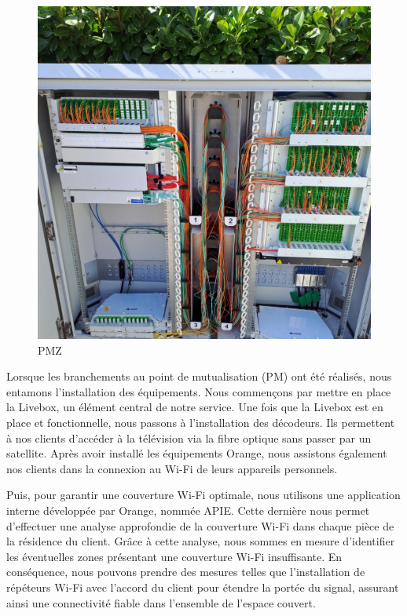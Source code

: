\documentclass[12pt, a4paper]{article}
\begin{document}
\begin{figure}[htbp]
\begin{minipage}[b]{0.4\textwidth}
      \includegraphics[width=\textwidth]{img/pmz.jpg}
      \caption{PMZ}
    \end{minipage}
\end{figure}

Lorsque les branchements au point de mutualisation (PM) ont été réalisés,
nous entamons l'installation des équipements. Nous commençons par mettre en place la Livebox,
un élément central de notre service.
Une fois que la Livebox est en place et fonctionnelle,
nous passons à l'installation des décodeurs. Ils
permettent à nos clients d'accéder à la télévision via la fibre optique
sans passer par un satellite. 
Après avoir installé les équipements Orange, nous assistons également
nos clients dans la connexion au Wi-Fi de leurs appareils personnels.

\newpage
Puis, pour garantir une couverture Wi-Fi optimale, nous utilisons une
application interne développée par Orange,
nommée APIE. Cette dernière nous permet d'effectuer
une analyse approfondie de la couverture Wi-Fi dans chaque pièce
de la résidence du client. Grâce à cette analyse,
nous sommes en mesure d'identifier les éventuelles zones
présentant une couverture Wi-Fi insuffisante. En conséquence,
nous pouvons prendre des mesures telles que
l'installation de répéteurs Wi-Fi avec l'accord du client 
pour étendre la portée du signal,
assurant ainsi une connectivité fiable dans l'ensemble de l'espace couvert.\\
\end{document}

